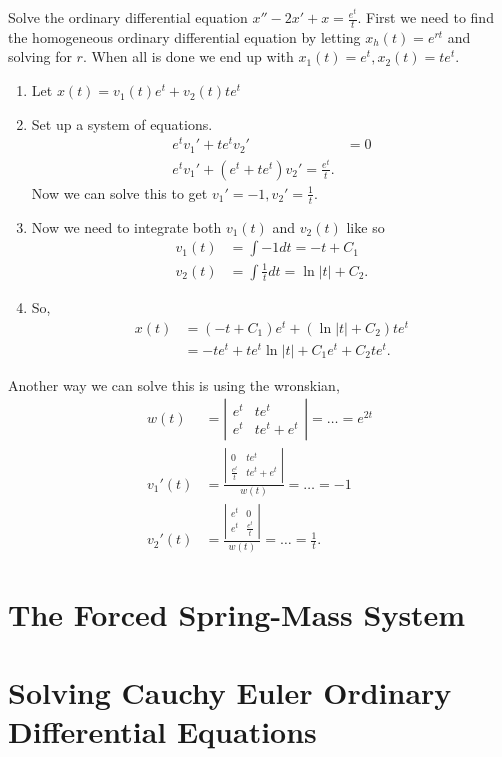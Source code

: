   \begin{problem}
    Solve the ordinary differential equation $x''-2x'+x=\frac{e^{t}}{t}$. First we need to find the homogeneous ordinary differential equation by letting $x_h(t)=e^{rt}$ and solving for $r$. When all is done we end up with $x_1(t)=e^{t},x_2(t)=te^{t}$.
    \begin{enumerate}
      \item Let $x(t)=v_1(t)e^{t}+v_2(t)te^{t}$
      \item Set up a system of equations.
        \begin{align*}
          e^{t}v_1'+te^{t}v_2'&=0\\
          e^{t}v_1'+\left( e^{t}+te^{t} \right)v_2'=\frac{e^{t}}{t} 
        .\end{align*}
        Now we can solve this to get $v_1'=-1,v_2'=\frac{1}{t}$.
      \item Now we need to integrate both $v_1(t)$ and $v_2(t) $ like so
        \begin{align*}
          v_1(t)&=\int -1dt=-t+C_1\\
          v_2(t)&=\int \frac{1}{t}dt=\ln|t|+C_2
        .\end{align*}
      \item So,
        \begin{align*}
          x(t)&=(-t+C_1)e^{t}+\left( \ln|t|+C_2 \right) te^{t}\\
              &=-te^{t}+te^{t}\ln|t|+C_1e^{t}+C_2te^{t}
        .\end{align*}
    \end{enumerate}
    Another way we can solve this is using the wronskian,
    \begin{align*}
      w(t)&= \left| \begin{matrix} e^{t}&te^{t}\\e^{t}&te^{t}+e^{t} \end{matrix} \right| = \ldots=e^{2t}\\
      v_1'(t)&=\frac{\left| \begin{matrix} 0&te^{t}\\\frac{e^{t}}{t}&te^{t}+e^{t} \end{matrix} \right| }{w(t)}=\ldots=-1\\
      v_2'(t)&=\frac{\left| \begin{matrix} e^{t}&0\\e^{t}&\frac{e^{t}}{t} \end{matrix} \right| }{w(t)}=\ldots=\frac{1}{t}
    .\end{align*}
  \end{problem}
\section{The Forced Spring-Mass System}
\section{Solving Cauchy Euler Ordinary Differential Equations}
